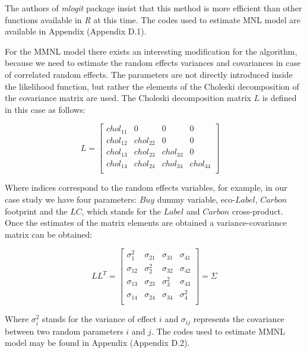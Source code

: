 \documentclass[12pt,]{article}
\begin{document}
The authors of \emph{mlogit} package insist that this method is more
efficient than other functions available in \emph{R} at this time. The
codes used to estimate MNL model are available in Appendix (Appendix
D.1).

For the MMNL model there exists an interesting modification for the
algorithm, because we need to estimate the random effects variances and
covariances in case of correlated random effects. The parameters are not
directly introduced inside the likelihood function, but rather the
elements of the Choleski decomposition of the covariance matrix are
used. The Choleski decomposition matrix \(L\) is defined in this case as
follows:

\begin{equation}
L=
    \begin{bmatrix} 
    chol_{11}  & 0         & 0     & 0 \\
    chol_{12}  & chol_{22}    & 0     & 0 \\
    chol_{13}  & chol_{23}    & chol_{33}& 0 \\
    chol_{14}  & chol_{24}    & chol_{34}& chol_{44} \\
    \end{bmatrix}
\quad
\end{equation}

Where indices correspond to the random effects variables, for example,
in our case study we have four parameters: \(Buy\) dummy variable,
eco-\(Label\), \(Carbon\) footprint and the \(LC\), which stands for the
\(Label\) and \(Carbon\) cross-product. Once the estimates of the matrix
elements are obtained a variance-covariance matrix can be obtained:

\begin{equation}
LL^T = 
    \begin{bmatrix} 
    \sigma_{1} ^2  & \sigma_{21}   & \sigma_{31}   & \sigma_{41} \\
    \sigma_{12}     & \sigma_{2}^2 & \sigma_{32}   & \sigma_{42} \\
    \sigma_{13}     & \sigma_{23}   & \sigma_{3}^2 & \sigma_{43} \\
    \sigma_{14}     & \sigma_{24}   & \sigma_{34}   & \sigma_{4}^2 \\
    \end{bmatrix}
= \Sigma
\end{equation}

Where \(\sigma_{i}^2\) stands for the variance of effect \(i\) and
\(\sigma_{ij}\) represents the covariance between two random parameters
\(i\) and \(j\). The codes used to estimate MMNL model may be found in
Appendix (Appendix D.2).
\end{document}

